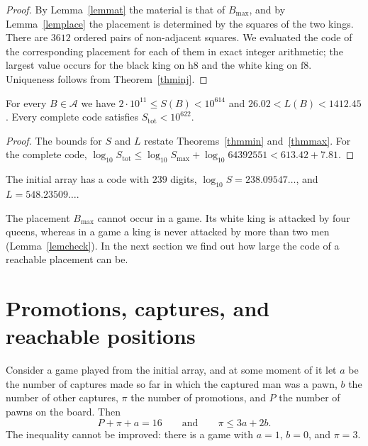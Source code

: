 \documentclass[12pt,reqno]{article}
\newcommand{\adm}{\mathcal{A}}
\newcommand{\sq}[1]{\mathrm{#1}}
\begin{document}
\begin{proof}
By Lemma~\ref{lemmat} the material is that of $B_{\max}$, and by Lemma~\ref{lemplace} the
placement is determined by the squares of the two kings. There are $3612$ ordered pairs of
non-adjacent squares. We evaluated the code of the corresponding placement for each of them
in exact integer arithmetic; the largest value occurs for the black king on $\sq{h8}$ and the
white king on $\sq{f8}$. Uniqueness follows from Theorem~\ref{thminj}.
\end{proof}

\begin{corollary}\label{corbounds}
For every $B\in\adm$ we have $2\cdot 10^{11}\leq S(B)<10^{614}$ and
$26.02<L(B)<1412.45$. Every complete code satisfies $S_{\mathrm{tot}}<10^{622}$.
\end{corollary}

\begin{proof}
The bounds for $S$ and $L$ restate Theorems~\ref{thmmin} and~\ref{thmmax}. For the complete
code, $\log_{10}S_{\mathrm{tot}}\leq \log_{10}S_{\max}+\log_{10}64392551<613.42+7.81$.
\end{proof}

\begin{example}
The initial array has a code with $239$ digits, $\log_{10}S=238.09547\ldots$, and
$L=548.23509\ldots$.
\end{example}

The placement $B_{\max}$ cannot occur in a game. Its white king is attacked by four queens,
whereas in a game a king is never attacked by more than two men (Lemma~\ref{lemcheck}). In the next section we find out
how large the code of a reachable placement can be.

\section{Promotions, captures, and reachable positions}\label{seccap}

\begin{lemma}\label{lemcap}
Consider a game played from the initial array, and at some moment of it let $a$ be the number
of captures made so far in which the captured man was a pawn, $b$ the number of other
captures, $\pi$ the number of promotions, and $P$ the number of pawns on the board. Then
\begin{equation}\label{eqcap}
P+\pi+a=16\qquad\text{and}\qquad \pi\leq 3a+2b .
\end{equation}
The inequality cannot be improved: there is a game with $a=1$, $b=0$, and $\pi=3$.
\end{lemma}
\end{document}
